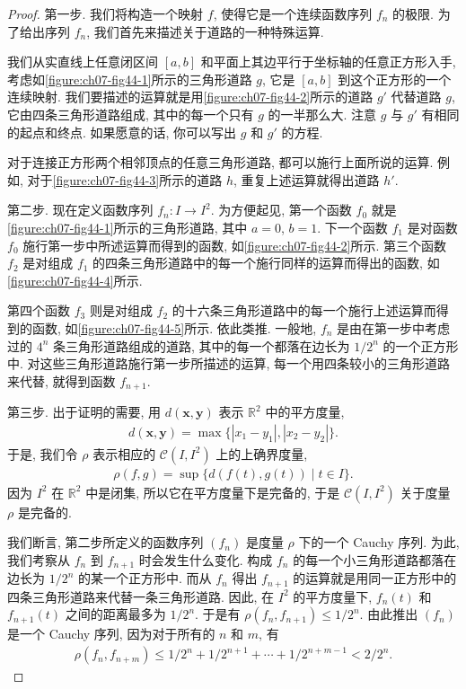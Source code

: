 \documentclass[../../main.tex]{subfiles}
\begin{document}
\begin{proof}
第一步. 我们将构造一个映射 $f$, 使得它是一个连续函数序列 $f_n$ 的极限. 为了给出序列 $f_n$, 我们首先来描述关于道路的一种特殊运算.

我们从实直线上任意闭区间 $[a,b]$ 和平面上其边平行于坐标轴的任意正方形入手, 考虑如\cref{figure:ch07-fig44-1}所示的三角形道路 $g$, 它是 $[a,b]$ 到这个正方形的一个连续映射. 我们要描述的运算就是用\cref{figure:ch07-fig44-2}所示的道路 $g'$ 代替道路 $g$, 它由四条三角形道路组成, 其中的每一个只有 $g$ 的一半那么大. 注意 $g$ 与 $g'$ 有相同的起点和终点. 如果愿意的话, 你可以写出 $g$ 和 $g'$ 的方程.



对于连接正方形两个相邻顶点的任意三角形道路, 都可以施行上面所说的运算. 例如, 对于\cref{figure:ch07-fig44-3}所示的道路 $h$, 重复上述运算就得出道路 $h'$.


第二步. 现在定义函数序列 $f_n\colon I\to I^2$. 为方便起见, 第一个函数 $f_0$ 就是\cref{figure:ch07-fig44-1}所示的三角形道路, 其中 $a=0$, $b=1$. 下一个函数 $f_1$ 是对函数 $f_0$ 施行第一步中所述运算而得到的函数, 如\cref{figure:ch07-fig44-2}所示. 第三个函数 $f_2$ 是对组成 $f_1$ 的四条三角形道路中的每一个施行同样的运算而得出的函数, 如\cref{figure:ch07-fig44-4}所示.


第四个函数 $f_3$ 则是对组成 $f_2$ 的十六条三角形道路中的每一个施行上述运算而得到的函数, 如\cref{figure:ch07-fig44-5}所示. 依此类推. 一般地, $f_n$ 是由在第一步中考虑过的 $4^n$ 条三角形道路组成的道路, 其中的每一个都落在边长为 $1/2^n$ 的一个正方形中. 对这些三角形道路施行第一步所描述的运算, 每一个用四条较小的三角形道路来代替, 就得到函数 $f_{n+1}$.


第三步. 出于证明的需要, 用 $d(\mathbf{x},\mathbf{y})$ 表示 $\mathbb{R}^2$ 中的平方度量,
\begin{align*}
d(\mathbf{x},\mathbf{y})=\max\{|x_1-y_1|,|x_2-y_2|\}.
\end{align*}
于是, 我们令 $\rho$ 表示相应的 $\mathcal{C}(I,I^2)$ 上的上确界度量,
\begin{align*}
\rho(f,g)=\sup\{d(f(t),g(t))\mid t\in I\}.
\end{align*}
因为 $I^2$ 在 $\mathbb{R}^2$ 中是闭集, 所以它在平方度量下是完备的, 于是 $\mathcal{C}(I,I^2)$ 关于度量 $\rho$ 是完备的.

我们断言, 第二步所定义的函数序列 $(f_n)$ 是度量 $\rho$ 下的一个 Cauchy 序列. 为此, 我们考察从 $f_n$ 到 $f_{n+1}$ 时会发生什么变化. 构成 $f_n$ 的每一个小三角形道路都落在边长为 $1/2^n$ 的某一个正方形中. 而从 $f_n$ 得出 $f_{n+1}$ 的运算就是用同一正方形中的四条三角形道路来代替一条三角形道路. 因此, 在 $I^2$ 的平方度量下, $f_n(t)$ 和 $f_{n+1}(t)$ 之间的距离最多为 $1/2^n$. 于是有 $\rho(f_n,f_{n+1})\leqslant 1/2^n$. 由此推出 $(f_n)$ 是一个 Cauchy 序列, 因为对于所有的 $n$ 和 $m$, 有
\begin{align*}
\rho(f_n,f_{n+m})\leqslant 1/2^n+1/2^{n+1}+\cdots+1/2^{n+m-1}<2/2^n.
\end{align*}


\end{proof}
\end{document}

